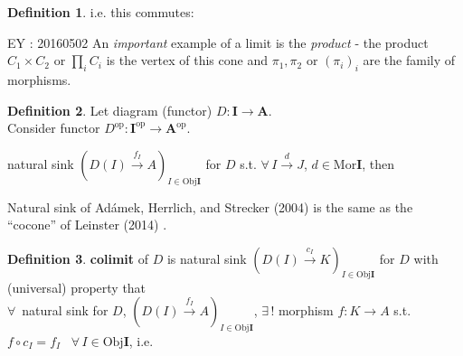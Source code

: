 \documentclass[twoside,landscape,10pt]{amsart}
\theoremstyle{plain}
\theoremstyle{definition}
\newtheorem{definition}{Definition}
\theoremstyle{remark}
\begin{document}
\begin{multicols*}{2}
\begin{definition}
i.e. this commutes:
\end{definition}

EY : 20160502 An \emph{important} example of a limit is the \emph{product} - the product $C_1 \times C_2$ or $\prod_i C_i$ is the vertex of this cone and $\pi_1, \pi_2$ or $( \pi_i )_i$ are the family of morphisms.  

\begin{definition}
Let diagram (functor) $D: \mathbf{I} \to \mathbf{A}$.  \\
Consider functor $D^{\text{op}} : \mathbf{I}^{\text{op}} \to \mathbf{A}^{\text{op}}$.  

natural sink $(D(I) \xrightarrow{ f_I} A )_{I \in \text{Obj}\mathbf{I}}$ for $D$ s.t. $\forall \, I \xrightarrow{d} J$, $d\in \text{Mor}\mathbf{I}$, then 


Natural sink of Ad\'{a}mek, Herrlich, and Strecker (2004) \cite{AHS2004} is the same as the ``cocone'' of Leinster (2014) \cite{Lein2014}.  

\end{definition}

\begin{definition}
  \textbf{colimit} of $D$ is natural sink $(D(I) \xrightarrow{ c_I} K)_{I \in \text{Obj}\mathbf{I}}$ for $D$ with \\
(universal) property that \\
$\forall \, $ natural sink for $D$, $(D(I) \xrightarrow{ f_I} A)_{I\in \text{Obj}\mathbf{I}}$, $\exists \, !$ morphism $f:K \to A$ s.t. $f\circ c_I = f_I$ \quad \,  $\forall \, I \in \text{Obj}\mathbf{I}$, i.e.


\end{definition}
\end{multicols*}
\end{document}
